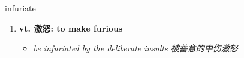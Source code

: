 
\begin{frame}
{\huge infuriate}
\begin{center}
\begin{enumerate}\Large
  \item \textbf{vt. 激怒: to make furious}
  \begin{itemize}
    \item \em{\Large{be infuriated by the deliberate insults 被蓄意的中伤激怒}}
  \end{itemize}
\end{enumerate}
\end{center}
\end{frame}
